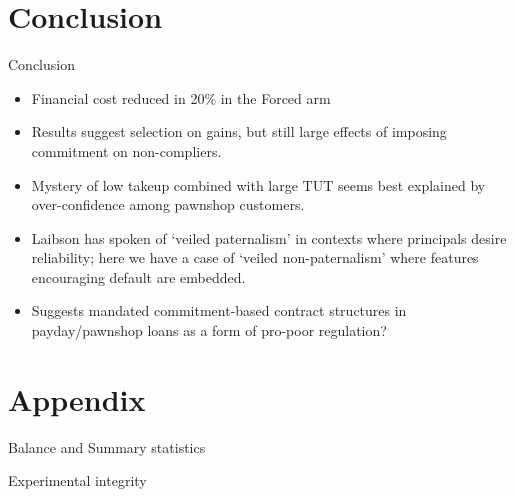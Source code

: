 \documentclass[8pt]{beamer}
\begin{document}
\section{Conclusion}
\begin{frame}{Conclusion}
    \begin{itemize}
    
        \item  Financial cost reduced in 20\% in the Forced arm
            
        \item Results suggest selection on gains, but still large effects of imposing commitment on non-compliers.
        
        \item Mystery of low takeup combined with large TUT seems best explained by over-confidence among pawnshop customers.
        
        \item Laibson has spoken of `veiled paternalism' in contexts where principals desire reliability; here we have a case of `veiled non-paternalism' where features encouraging default are embedded.
        
        \item Suggests mandated commitment-based contract structures in payday/pawnshop loans as a form of pro-poor regulation?
    \end{itemize}  
\end{frame}

\appendix

\section{Appendix}




\begin{frame}{Balance and Summary statistics}
    \begin{table}[H]
\caption{Summary statistics and Balance}
\label{SS}
\begin{center}
\resizebox{.65\textwidth}{!}{
\scriptsize{}
}
\end{center}

\end{table}
\end{frame}

\begin{frame}{Experimental integrity}
    \begin{table}[H]
\caption{Attrition table}
\label{attrition_table}
\begin{center}
\scriptsize{}
\end{center}
\end{table}
\end{frame}
\end{document}
